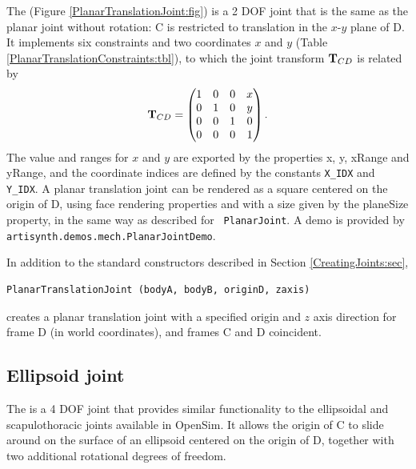 The  
(Figure \ref{PlanarTranslationJoint:fig}) is a 2 DOF joint
that is the same as the planar joint without rotation:
C is restricted to translation in the $x$-$y$ plane of D.
It implements six
constraints and two coordinates $x$ and $y$
(Table \ref{PlanarTranslationConstraints:tbl}), to which the joint transform
${\bf T}_{CD}$ is related by
%
\begin{equation*}
{\bf T}_{CD} = \left(\begin{matrix}
1 & 0 & 0 & x \\
0 & 1 & 0 & y \\
0 & 0 & 1 & 0 \\
0 & 0 & 0 & 1 
\end{matrix}\right).
\end{equation*}
The value and ranges for $x$ and $y$ are exported by the properties
{\sf x}, {\sf y}, {\sf xRange} and {\sf yRange}, and the coordinate
indices are defined by the constants {\tt X\_IDX} and {\tt Y\_IDX}.  A
planar translation joint can be rendered as a square centered on the
origin of D, using face rendering properties and with a size given by
the {\sf planeSize} property, in the same way as described for {\tt
PlanarJoint}.  A demo is provided by {\tt
artisynth.demos.mech.PlanarJointDemo}.

In addition to the standard constructors described in
Section \ref{CreatingJoints:sec},
\begin{lstlisting}[]
  PlanarTranslationJoint (bodyA, bodyB, originD, zaxis)
\end{lstlisting}
%
creates a planar translation joint with a specified origin and $z$
axis direction for frame D (in world coordinates), and frames C and D
coincident.

\subsection{Ellipsoid joint}

The  is a 4 DOF
joint that provides similar functionality to the ellipsoidal and
scapulothoracic joints available in OpenSim. It allows the origin of C
to slide around on the surface of an ellipsoid centered on the origin
of D, together with two additional rotational degrees of freedom.

